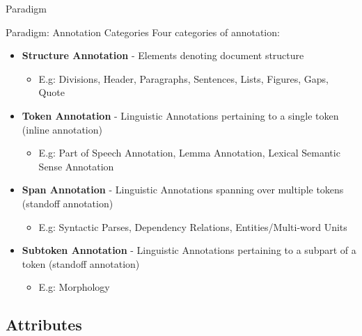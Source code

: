 \documentclass[compress,10pt]{beamer}
\begin{document}
\begin{frame}{Paradigm}
    \begin{block}{Paradigm: Annotation Categories}
        Four categories of annotation:    
        \begin{itemize}            
            \item \textbf{Structure Annotation} - Elements denoting document structure
            \begin{itemize}
                \item {\footnotesize E.g: Divisions, Header, Paragraphs, Sentences, Lists, Figures, Gaps, Quote }
            \end{itemize}
            \item \textbf{Token Annotation} - Linguistic Annotations pertaining to a single token (inline annotation)
            \begin{itemize}
                \item {\footnotesize E.g: Part of Speech Annotation, Lemma Annotation, Lexical Semantic Sense Annotation }
            \end{itemize}
            \item \textbf{Span Annotation} - Linguistic Annotations spanning over multiple tokens (standoff annotation)
            \begin{itemize}
                \item {\footnotesize E.g: Syntactic Parses, Dependency Relations, Entities/Multi-word Units}
            \end{itemize}
			\item \textbf{Subtoken Annotation} - Linguistic Annotations pertaining to a subpart of a token (standoff annotation)
            \begin{itemize}
                \item {\footnotesize E.g: Morphology}
            \end{itemize}
        \end{itemize}           
    \end{block}
\end{frame}

\subsection{Attributes}
\end{document}
